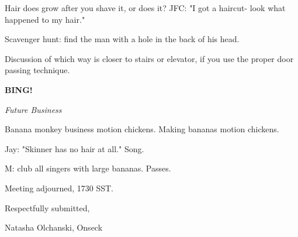 \documentclass[12pt]{article}
\newcommand{\bing}{{\bf BING!} }
\newcommand{\goto}[1]{\bing \vskip 12pt \centerline{{\em{#1}}}}
\begin{document}
Hair does grow after you shave it, or does it? JFC: "I got a haircut- look what happened to my hair."

Scavenger hunt: find the man with a hole in the back of his head.

Discussion of which way is closer to stairs or elevator, if you use the proper door passing technique.

\goto{Future Business}

Banana monkey business motion chickens. Making bananas motion chickens.

Jay: "Skinner has no hair at all." Song.

M: club all singers with large bananas. Passes.

\vspace{12pt}

\noindent
Meeting adjourned, 1730 SST.

\vspace{18pt}

\centerline{Respectfully submitted,}
\centerline{Natasha Olchanski, Onseck}
\end{document}
